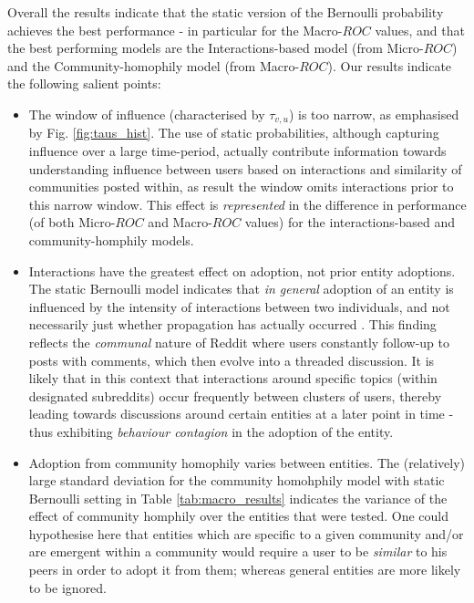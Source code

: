 \documentclass[journal,10pt,draftclsnofoot,onecolumn]{IEEEtran}
\begin{document}
Overall the results indicate that the static version of the Bernoulli probability achieves the best performance - in particular for the Macro-$ROC$ values, and that the best performing models are the Interactions-based model (from Micro-$ROC$) and the Community-homophily model (from Macro-$ROC$).
Our results indicate the following salient points:

\begin{itemize}
	\item The window of influence (characterised by $\tau_{v,u}$) is too narrow, as emphasised by Fig. \ref{fig:taus_hist}. 
	The use of static probabilities, although capturing influence over a large time-period, actually contribute information towards understanding influence between users based on interactions and similarity of communities posted within, as result the window omits interactions prior to this narrow window.
	This effect is \emph{represented} in the difference in performance (of both Micro-$ROC$ and Macro-$ROC$ values) for the interactions-based and community-homphily models.
		
	\item Interactions have the greatest effect on adoption, not prior entity adoptions.
	The static Bernoulli model indicates that \emph{in general} adoption of an entity is influenced by the intensity of interactions between two individuals, and not necessarily just whether propagation has actually occurred .
	This finding reflects the \emph{communal} nature of Reddit where users constantly follow-up to posts with comments, which then evolve into a threaded discussion.
	It is likely that in this context that interactions around specific topics (within designated subreddits) occur frequently between clusters of users, thereby leading towards discussions around certain entities at a later point in time - thus exhibiting \emph{behaviour contagion} in the adoption of the entity.
	
	\item Adoption from community homophily varies between entities.
	The (relatively) large standard deviation for the community homohphily model with static Bernoulli setting in Table \ref{tab:macro_results} indicates the variance of the effect of community homphily over the entities that were tested.
	One could hypothesise here that entities which are specific to a given community and/or are emergent within a community would require a user to be \emph{similar} to his peers in order to adopt it from them; whereas general entities are more likely to be ignored.
	
\end{itemize}
\end{document}
